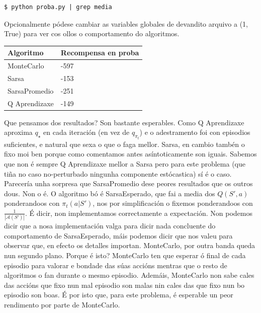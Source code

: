 \documentclass{article}
\begin{document}
\begin{tcolorbox}[colback=black!5!white, colframe=black!75!white, title=Reproducir a táboa de debaixo]
\begin{lstlisting}[basicstyle=\ttfamily\small]
$ python proba.py | grep media
\end{lstlisting}
\end{tcolorbox}

Opcionalmente pódese cambiar as variables globales de devandito arquivo a (1, True) para ver cos ollos o comportamento do algoritmos.


\begin{table}[htbp]
\centering
\begin{tabular}{@{}ll@{}}
\toprule
Algoritmo     & Recompensa en proba \\ \midrule
MonteCarlo    & -597                                     \\
Sarsa         & -153                                     \\
SarsaPromedio & -251                                     \\
Q Aprendizaxe & -149                                     \\ 
\bottomrule
\end{tabular}
\end{table}

Que pensamos dos resultados? Son bastante esperables. Como Q Aprendizaxe aproxima $q_\star$ en cada iteración (en vez de $q_{\pi_{t}}$) e o adestramento foi con episodios suficientes, e natural que sexa o que o faga mellor. Sarsa, en cambio tambén o fixo moi ben porque como comentamos antes asíntoticamente son iguais. Sabemos que non é sempre Q Aprendizaxe mellor a Sarsa pero para este problema (que tiña no caso no-perturbado ningunha componente estócastica) sí é o caso. Parecería unha sorpresa que SarsaPromedio dese peores resultados que os outros dous. Non o é. O algoritmo bó é SarsaEsperado, que fai a media dos $Q(S',a)$ ponderandoos con $\pi_t(a|S')$, nos por simplificación o fixemos ponderandoos con $\frac{1}{|\mathcal{A}(S')|}$. É dicir, non implementamos correctamente a expectación. Non podemos dicir que a nosa implementación valga para dicir nada concluente do comportamento de SarsaEsperado, máis podemos dicir que nos valeu para observar que, en efecto os detalles importan. MonteCarlo, por outra banda queda nun segundo plano. Porque é isto? MonteCarlo ten que esperar ó final de cada episodio para valorar e bondade das súas accións mentras que o resto de algoritmos o fan durante o mesmo episodio. Ademáis, MonteCarlo non sabe cales das accións que fixo nun mal episodio son malas nin cales das que fixo nun bo episodio son boas. É por isto que, para este problema, é esperable un peor rendimento por parte de MonteCarlo. 
\end{document}

